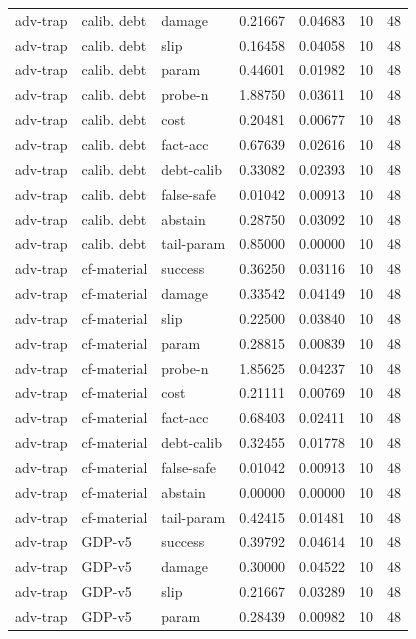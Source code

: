 \documentclass{article}
\begin{document}
\begin{center}
\begin{longtable}{lllllll}
adv-trap & calib. debt & damage & 0.21667 & 0.04683 & 10 & 48 \\
adv-trap & calib. debt & slip & 0.16458 & 0.04058 & 10 & 48 \\
adv-trap & calib. debt & param & 0.44601 & 0.01982 & 10 & 48 \\
adv-trap & calib. debt & probe-n & 1.88750 & 0.03611 & 10 & 48 \\
adv-trap & calib. debt & cost & 0.20481 & 0.00677 & 10 & 48 \\
adv-trap & calib. debt & fact-acc & 0.67639 & 0.02616 & 10 & 48 \\
adv-trap & calib. debt & debt-calib & 0.33082 & 0.02393 & 10 & 48 \\
adv-trap & calib. debt & false-safe & 0.01042 & 0.00913 & 10 & 48 \\
adv-trap & calib. debt & abstain & 0.28750 & 0.03092 & 10 & 48 \\
adv-trap & calib. debt & tail-param & 0.85000 & 0.00000 & 10 & 48 \\
adv-trap & cf-material & success & 0.36250 & 0.03116 & 10 & 48 \\
adv-trap & cf-material & damage & 0.33542 & 0.04149 & 10 & 48 \\
adv-trap & cf-material & slip & 0.22500 & 0.03840 & 10 & 48 \\
adv-trap & cf-material & param & 0.28815 & 0.00839 & 10 & 48 \\
adv-trap & cf-material & probe-n & 1.85625 & 0.04237 & 10 & 48 \\
adv-trap & cf-material & cost & 0.21111 & 0.00769 & 10 & 48 \\
adv-trap & cf-material & fact-acc & 0.68403 & 0.02411 & 10 & 48 \\
adv-trap & cf-material & debt-calib & 0.32455 & 0.01778 & 10 & 48 \\
adv-trap & cf-material & false-safe & 0.01042 & 0.00913 & 10 & 48 \\
adv-trap & cf-material & abstain & 0.00000 & 0.00000 & 10 & 48 \\
adv-trap & cf-material & tail-param & 0.42415 & 0.01481 & 10 & 48 \\
adv-trap & GDP-v5 & success & 0.39792 & 0.04614 & 10 & 48 \\
adv-trap & GDP-v5 & damage & 0.30000 & 0.04522 & 10 & 48 \\
adv-trap & GDP-v5 & slip & 0.21667 & 0.03289 & 10 & 48 \\
adv-trap & GDP-v5 & param & 0.28439 & 0.00982 & 10 & 48 \\
\bottomrule
\end{longtable}
\renewcommand{\arraystretch}{1.0}
\end{center}
\end{document}
